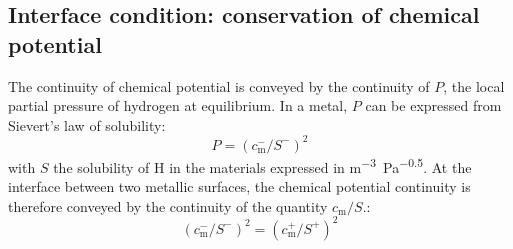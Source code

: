 \subsection{Interface condition: conservation of chemical potential}



    

The continuity of chemical potential is conveyed by the continuity of $P$, the local partial pressure of hydrogen at equilibrium.
In a metal, $P$ can be expressed from Sievert's law of solubility:
\begin{equation}
    P = (c_\mathrm{m}^-/S^-)^2
\end{equation}
with $S$ the solubility of H in the materials expressed in \si{m^{-3}.Pa^{-0.5}}.
At the interface between two metallic surfaces, the chemical potential continuity is therefore conveyed by the continuity of the quantity $c_\mathrm{m}/S$.:
\begin{equation}
    (c_\mathrm{m}^-/S^-)^2 = (c_\mathrm{m}^+/S^+)^2
\end{equation}

